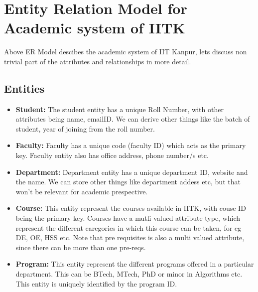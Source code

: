 \documentclass[a4paper]{article}
\begin{document}


\section*{Entity Relation Model for Academic system of IITK}
Above ER Model descibes the academic system of IIT Kanpur, lets discuss non trivial part of the attributes and relationships in more detail.

\subsection*{Entities}
\begin{itemize}
	\item{\textbf{Student:}} The student entity has a unique Roll Number, with other attributes being name, emailID.
	We can derive other things like the batch of student, year of joining from the roll number.
	\item{\textbf{Faculty:}} Faculty has a unique code (faculty ID) which acts as the primary key.
	Faculty entity also has office address, phone number/s etc.
	\item{\textbf{Department:}} Department entity has a unique department ID, website and the name.
	We can store other things like department addess etc, but that won't be relevant for academic prespective.
	\item{\textbf{Course:}} This entity represent the courses available in IITK, with couse ID being the primary key.
	Courses have a mutli valued attribute type, which represent the different caregories in which
	this course can be taken, for eg DE, OE, HSS etc. Note that pre requisites is also a multi valued attribute,
	since there can be more  than one pre-reqs.
	\item{\textbf{Program:}} This entity represent the different programs offered in a particular department.
	This can be BTech, MTech, PhD or minor in Algorithms etc. This entity is uniquely identified by the program ID.
\end{itemize}
\end{document}
